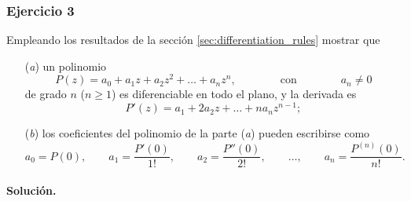 \documentclass[a4paper]{report}
\begin{document}
\subsubsection{Ejercicio 3}

Empleando los resultados de la sección \ref{sec:differentiation_rules} mostrar que 
\begin{enumerate}
 \item[(\textit{a})] un polinomio
 \[
  P(z)=a_0+a_1z+a_2z^2+\dots+a_nz^n,\qquad\qquad\textrm{con}\qquad\qquad a_n\neq0
 \]
 de grado \(n\) (\(n\geq1\)) es diferenciable en todo el plano, y la derivada es
 \[
  P'(z)=a_1+2a_2z+\dots+na_nz^{n-1};
 \]
 \item[(\textit{b})] los coeficientes del polinomio de la parte (\textit{a}) pueden escribirse como 
 \[
  a_0=P(0),\qquad a_1=\frac{P'(0)}{1!},\qquad a_2=\frac{P''(0)}{2!},\qquad\dots,\qquad a_n=\frac{P^{(n)}(0)}{n!}.
 \]
\end{enumerate}

\paragraph{Solución.}
\end{document}
